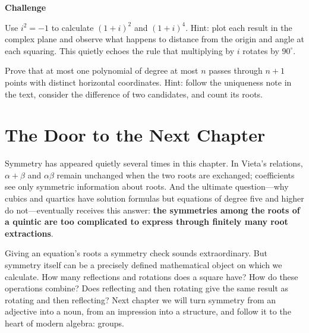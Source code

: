 \textbf{Challenge}
\begin{sikao}
\item Use $i^2=-1$ to calculate $(1+i)^2$ and $(1+i)^4$. Hint: plot each result in the complex plane and observe what happens to distance from the origin and angle at each squaring. This quietly echoes the rule that multiplying by $i$ rotates by $90^\circ$.
\item Prove that at most one polynomial of degree at most $n$ passes through $n+1$ points with distinct horizontal coordinates. Hint: follow the uniqueness note in the text, consider the difference of two candidates, and count its roots.
\end{sikao}

\section*{The Door to the Next Chapter}

Symmetry has appeared quietly several times in this chapter. In Vieta's relations, $\alpha+\beta$ and $\alpha\beta$ remain unchanged when the two roots are exchanged; coefficients see only symmetric information about roots. And the ultimate question---why cubics and quartics have solution formulas but equations of degree five and higher do not---eventually receives this answer: \textbf{the symmetries among the roots of a quintic are too complicated to express through finitely many root extractions}.

Giving an equation's roots a symmetry check sounds extraordinary. But symmetry itself can be a precisely defined mathematical object on which we calculate. How many reflections and rotations does a square have? How do these operations combine? Does reflecting and then rotating give the same result as rotating and then reflecting? Next chapter we will turn symmetry from an adjective into a noun, from an impression into a structure, and follow it to the heart of modern algebra: groups.
